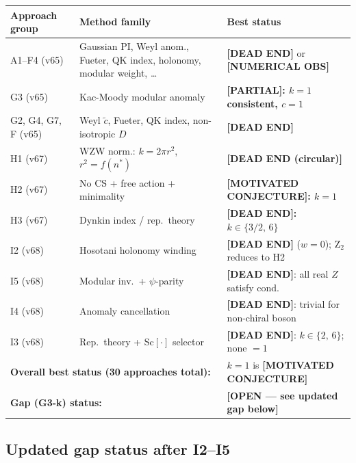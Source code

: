 \documentclass[11pt,a4paper]{article}
\theoremstyle{definition}
\theoremstyle{remark}
\begin{document}
\begin{center}
\begin{tabular}{p{2.0cm}p{5.0cm}p{5.5cm}}
  \toprule
  Approach group & Method family & Best status \\
  \midrule
  A1--F4 (v65) & Gaussian PI, Weyl anom., Fueter, QK index, holonomy,
    modular weight, \ldots & \textbf{[DEAD END]} or \textbf{[NUMERICAL OBS]} \\
  G3 (v65) & Kac-Moody modular anomaly & \textbf{[PARTIAL]: $k = 1$ consistent, $c = 1$} \\
  G2, G4, G7, F (v65) & Weyl $\tilde c$, Fueter, QK index, non-isotropic $D$ &
    \textbf{[DEAD END]} \\
  H1 (v67) & WZW norm.: $k = 2\pi r^2$, $r^2 = f(n^*)$ &
    \textbf{[DEAD END (circular)]} \\
  H2 (v67) & No CS + free action + minimality &
    \textbf{[MOTIVATED CONJECTURE]: $k = 1$} \\
  H3 (v67) & Dynkin index / rep.\ theory &
    \textbf{[DEAD END]: $k \in \{3/2,\,6\}$} \\
  I2 (v68) & Hosotani holonomy winding &
    \textbf{[DEAD END]} ($w = 0$); Z$_2$ reduces to H2 \\
  I5 (v68) & Modular inv.\ + $\psi$-parity &
    \textbf{[DEAD END]}: all real $Z$ satisfy cond.\ \\
  I4 (v68) & Anomaly cancellation &
    \textbf{[DEAD END]}: trivial for non-chiral boson \\
  I3 (v68) & Rep.\ theory + Sc$[\cdot]$ selector &
    \textbf{[DEAD END]}: $k \in \{2,\,6\}$; none $= 1$ \\
  \midrule
  \multicolumn{2}{l}{\textbf{Overall best status (30 approaches total):}} &
    $k = 1$ is \textbf{[MOTIVATED CONJECTURE]} \\
  \multicolumn{2}{l}{\textbf{Gap (G3-k) status:}} &
    \textbf{[OPEN — see updated gap below]} \\
  \bottomrule
\end{tabular}
\end{center}

\subsection{Updated gap status after I2--I5}
\end{document}
